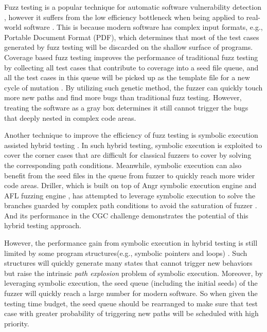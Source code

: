 

Fuzz testing is a popular technique for automatic software vulnerability detection \cite{Miller:Fuzz, 5010257, sutton2007fuzzing}, 
however it suffers from the low efficiency bottleneck when being applied to real-world software \cite{neystadt2008automated, godefroid2008automating, ganesh2009taint, cadar2011symbolic, rawat2017vuzzer, stephens2016driller}. 
This is because modern software has complex input formats, e.g., Portable Document Format (PDF), which determines that most of the test cases generated 
 by fuzz testing will be discarded on the shallow surface of programs. 
 Coverage based fuzz testing improves the performance of traditional fuzz testing 
 by collecting all test cases that contribute to coverage into a seed file queue, 
 and all the test cases in this queue will be picked up as the template file for a new cycle of mutation \cite{rawat2017vuzzer, online:afl, stephens2016driller}.
 By utilizing such genetic method, 
 the fuzzer can quickly touch more new paths and find more bugs 
 than traditional fuzz testing. 
 However, treating the software as a gray box determines it still cannot trigger the bugs 
 that deeply nested in complex code areas.  

Another technique to improve the efficiency of fuzz testing is symbolic execution assisted hybrid testing \cite{yeh2015craxfuzz, majumdar2007hybrid, pak2012hybrid}.
 In such hybrid testing, symbolic execution is exploited to cover the corner cases that are difficult for classical fuzzers to cover by solving the corresponding path conditions.
 Meanwhile, symbolic execution can also benefit from the seed files in the queue from fuzzer 
 to quickly reach more wider code areas. 
 Driller, which is built on top of Angr symbolic execution engine \cite{Shoshitaishvili_firmalice-automatic} and AFL fuzzing engine \cite{online:afl}, 
 has attempted to leverage symbolic execution to solve the branches guarded 
 by complex path conditions to avoid the saturation of fuzzer \cite{stephens2016driller}. 
 And its performance in the CGC challenge \cite{online:CGC} demonstrates the potential of this hybrid testing approach.

However, the performance gain from symbolic execution in hybrid testing is still limited 
 by some program structures(e.g., symbolic pointers and loops) \cite{Boonstoppel:RAP, cadar2011symbolic, baldoni2016survey}. 
 Such structures will quickly generate many states that cannot trigger new behaviors 
 but raise the intrinsic \textit{path explosion} problem of symbolic execution.
 Moreover, by leveraging symbolic execution, 
 the seed queue (including the initial seeds) of the fuzzer will quickly reach a large number for modern software. 
 So when given the testing time budget, the seed queue should be rearranged to make sure 
 that test case with greater probability of triggering new paths will be scheduled with high priority.  

